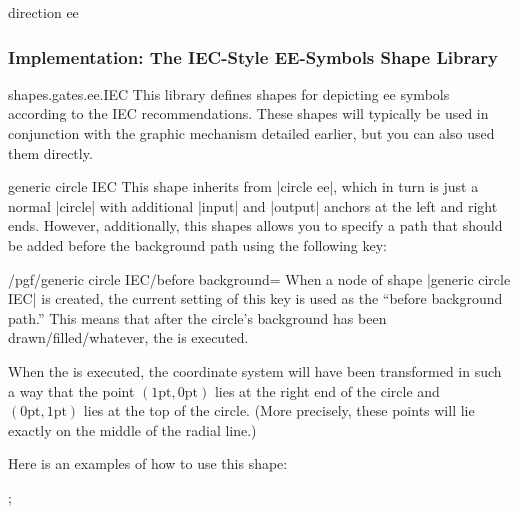 \begin{shape}{direction ee}
\begin{codeexample}[]
\end{codeexample}
\end{shape}


\subsubsection{Implementation: The IEC-Style EE-Symbols Shape Library}

\begin{pgflibrary}{shapes.gates.ee.IEC}
  This library defines shapes for depicting ee symbols according to
  the IEC recommendations. These shapes will typically be
  used in conjunction with the graphic mechanism detailed earlier, but
  you can also used them directly.
\end{pgflibrary}

\begin{shape}{generic circle IEC}
  This shape inherits from |circle ee|, which in turn is just a normal
  |circle| with additional |input| and |output| anchors at the left
  and right ends. However, additionally, this shapes allows you to
  specify a path that should be added before the background path using
  the following key:
  \begin{key}{/pgf/generic circle IEC/before background=}
    When a node of shape |generic circle IEC| is created, the current
    setting of this key is used as the ``before background path.''
    This means that after the circle's background has been
    drawn/filled/whatever, the  is executed.

    When the  is executed, the coordinate system will have
    been transformed in such a way that the point
    $(1\mathrm{pt},0\mathrm{pt})$ lies at the right end of the circle
    and $(0\mathrm{pt},1\mathrm{pt})$ lies at the top of the
    circle. (More precisely, these points will lie exactly on the
    middle of the radial line.)
  \end{key}
  Here is an examples of how to use this shape:
\begin{codeexample}[]
\tikz {};
\end{codeexample}
\end{shape}


